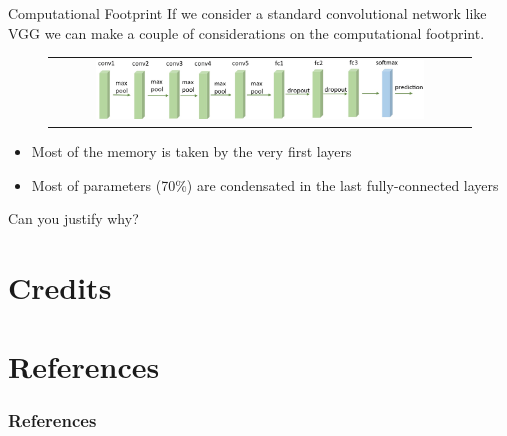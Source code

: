 \documentclass[aspectratio=169]{beamer}
\begin{document}

\begin{frame}{Computational Footprint}
If we consider a standard convolutional network like VGG \cite{simonyan2014very} we can make a couple of considerations on the computational footprint.
\begin{figure}
\begin{tabular}{c}
\includegraphics[width=0.8\textwidth]{img/cnn/vgg16.jpg}
\end{tabular}
\end{figure}
\begin{itemize}
\item Most of the memory is taken by the very first layers
\item Most of parameters (70\%) are condensated in the last fully-connected layers
\end{itemize}
\small{Can you justify why?}
\end{frame}





\section{Credits}



\section{References}

\begin{frame}[t, allowframebreaks]
\frametitle{References}


\end{frame}
\end{document}
